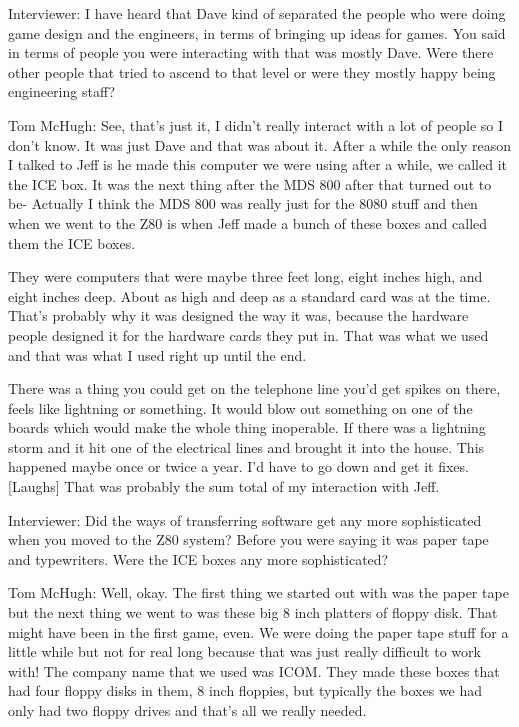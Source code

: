 \textcolor{interviewer}{Interviewer:} I have heard that Dave kind of separated the people who were doing game design and the engineers, in terms of bringing up ideas for games. You said in terms of people you were interacting with that was mostly Dave. Were there other people that tried to ascend to that level or were they mostly happy being engineering staff?

\textcolor{interviewee}{Tom McHugh:} See, that’s just it, I didn’t really interact with a lot of people so I don’t know. It was just Dave and that was about it. After a while the only reason I talked to Jeff is he made this computer we were using after a while, we called it the ICE box. It was the next thing after the MDS 800 after that turned out to be- Actually I think the MDS 800 was really just for the 8080 stuff and then when we went to the Z80 is when Jeff made a bunch of these boxes and called them the ICE boxes.

They were computers that were maybe three feet long, eight inches high, and eight inches deep. About as high and deep as a standard card was at the time. That’s probably why it was designed the way it was, because the hardware people designed it for the hardware cards they put in. That was what we used and that was what I used right up until the end.

There was a thing you could get on the telephone line you’d get spikes on there, feels like lightning or something. It would blow out something on one of the boards which would make the whole thing inoperable. If there was a lightning storm and it hit one of the electrical lines and brought it into the house. This happened maybe once or twice a year. I’d have to go down and get it fixes. [Laughs] That was probably the sum total of my interaction with Jeff.

\textcolor{interviewer}{Interviewer:} Did the ways of transferring software get any more sophisticated when you moved to the Z80 system? Before you were saying it was paper tape and typewriters. Were the ICE boxes any more sophisticated?

\textcolor{interviewee}{Tom McHugh:} Well, okay. The first thing we started out with was the paper tape but the next thing we went to was these big 8 inch platters of floppy disk. That might have been in the first game, even. We were doing the paper tape stuff for a little while but not for real long because that was just really difficult to work with! The company name that we used was ICOM. They made these boxes that had four floppy disks in them, 8 inch floppies, but typically the boxes we had only had two floppy drives and that’s all we really needed.

